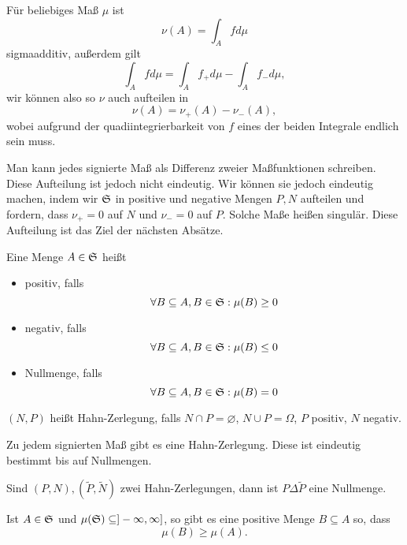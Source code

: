 		\begin{bsp}
			Für beliebiges Maß $\mu$ ist
			\[ \nu(A)=\int_A fd\mu \]
			sigmaadditiv, außerdem gilt
			\[ \int_Afd\mu=\int_A f_+d\mu-\int_A f_-d\mu, \]
			wir können also so $\nu$ auch aufteilen in
			\[ \nu(A)=\nu_+(A)-\nu_-(A), \]
			wobei aufgrund der quadiintegrierbarkeit von $f$ eines der beiden Integrale endlich sein muss. 
		\end{bsp}
		
		\begin{bem}
			Man kann jedes signierte Maß als Differenz zweier Maßfunktionen schreiben. Diese Aufteilung ist jedoch nicht eindeutig. Wir können sie jedoch eindeutig machen, indem wir $\mathfrak{S}$ in positive und negative Mengen $P,N$ aufteilen und fordern, dass $\nu_+=0$ auf $N$ und $\nu_-=0$ auf $P$. Solche Maße heißen singulär. Diese Aufteilung ist das Ziel der nächsten Absätze.
		\end{bem}
		
		\begin{defi}
			Eine Menge $A\in\mathfrak{S}$ heißt
			\begin{itemize}
				\item positiv, falls
				\[ \forall B\subseteq A, B\in\mathfrak{S}: \mu(B)\ge 0 \]
				\item negativ, falls
				\[ \forall B\subseteq A, B\in\mathfrak{S}: \mu(B)\le 0 \]
				\item Nullmenge, falls
				\[ \forall B\subseteq A, B\in\mathfrak{S}: \mu(B)= 0 \]
			\end{itemize}
		\end{defi}
		
		\begin{defi}
			$(N,P)$ heißt Hahn-Zerlegung, falls $N\cap P=\varnothing$, $N\cup P=\Omega$, $P$ positiv, $N$ negativ. 
		\end{defi}
		
		\begin{satz}
			Zu jedem signierten Maß gibt es eine Hahn-Zerlegung. Diese ist eindeutig bestimmt bis auf Nullmengen.
		\end{satz}
		
		\begin{bem}
			Sind $(P,N), (\tilde{P},\tilde{N})$ zwei Hahn-Zerlegungen, dann ist $P\Delta \tilde{P}$ eine Nullmenge. 
		\end{bem}
		
		\begin{lemma}
			Ist $A\in\mathfrak{S}$ und $\mu(\mathfrak{S})\subseteq ]-\infty,\infty]$, so gibt es eine positive Menge $B\subseteq A$ so, dass 
			\[ \mu(B)\ge\mu(A). \]
		\end{lemma}
		
